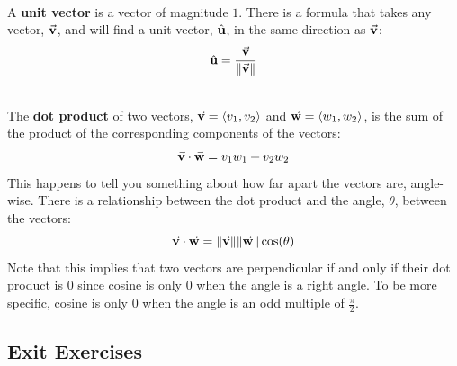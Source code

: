 \begin{myDefinition}~\\[0.5mm]
	A \textbf{unit vector} is a vector of magnitude $1$. There is a formula that takes any vector, $\vec{\textbf{v}}$, and will find a unit vector, $\hat{\textbf{u}}$, in the same direction as $\vec{\textbf{v}}$:
\[\hat{\textbf{u}}=\frac{\vec{\textbf{v}}}{\lVert\vec{\textbf{v}}\rVert}\]
\end{myDefinition}

\begin{myDefinition}~\\[0.5mm]
	The \textbf{dot product} of two vectors, $\vec{\textbf{v}}=\left\langle v_1,v_2 \right\rangle$ and $\vec{\textbf{w}}=\left\langle w_1,w_2 \right\rangle$, is the sum of the product of the corresponding components of the vectors: 
		\[\vec{\textbf{v}}\cdot\vec{\textbf{w}}=v_1w_1+v_2w_2\] 
	This happens to tell you something about how far apart the vectors are, angle-wise. There is a relationship between the dot product and the angle, $\theta$, between the vectors: 
		\[\vec{\textbf{v}}\cdot\vec{\textbf{w}}=\lVert\vec{\textbf{v}}\rVert\lVert\vec{\textbf{w}}\rVert\cos(\theta)\]
	Note that this implies that two vectors are perpendicular if and only if their dot product is $0$ since cosine is only $0$ when the angle is a right angle. To be more specific, cosine is only $0$ when the angle is an odd multiple of $\frac{\pi}{2}$.
\end{myDefinition}

\newpage

\subsection*{Exit Exercises} \label{exit-exercises-section-vectors}

